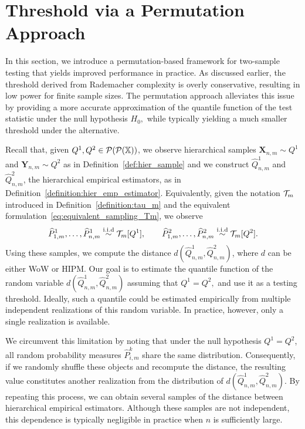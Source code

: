 \section{Threshold via a Permutation Approach}\label{section:permutation_approach}


In this section, we introduce a permutation-based framework for two-sample testing that yields improved performance in practice. As discussed earlier, the threshold derived from Rademacher complexity is overly conservative, resulting in low power for finite sample sizes. The permutation approach alleviates this issue by providing a more accurate approximation of the quantile function of the test statistic under the null hypothesis $H_0,$ while typically yielding a much smaller threshold under the alternative.

Recall that, given $Q^1,Q^2\in \mathcal{P}(\mathcal{P}(\mathbb{X}))$, we observe hierarchical samples $\mathbf{X}_{n,m} \sim Q^1$ and $\mathbf{Y}_{n,m} \sim Q^2$ as in Definition~\ref{def:hier_sample} and we construct $\widehat{Q}^1_{n,m}$ and $\widehat{Q}^{2}_{n,m}$, the hierarchical empirical estimators, as in Definition~\ref{definition:hier_emp_estimator}. Equivalently, given the notation $\mathcal{T}_m$ introduced in Definition~\ref{definition:tau_m} and the equivalent formulation~\eqref{eq:equivalent_sampling_Tm}, we observe
\[
\widehat{P}^1_{1,m}, \dots, \widehat{P}^1_{n,m} \overset{\mathrm{i.i.d}}{\sim} \mathcal{T}_m[Q^{1}], \qquad \widehat{P}^2_{1,m}, \dots, \widehat{P}^2_{n,m} \overset{\mathrm{i.i.d}}{\sim} \mathcal{T}_m[Q^{2}].
\]
Using these samples, we compute the distance $d(\widehat{Q}^1_{n,m}, \widehat{Q}^2_{n,m})$, where $d$ can be either WoW or HIPM. Our goal is to estimate the quantile function of the random variable $d(\widehat{Q}^1_{n,m}, \widehat{Q}^2_{n,m})$ assuming that $Q^1 = Q^2,$ and use it as a testing threshold. Ideally, such a quantile could be estimated empirically from multiple independent realizations of this random variable. In practice, however, only a single realization is available.

We circumvent this limitation by noting that under the null hypothesis $Q^1 = Q^2$, all random probability measures $\widehat{P}^k_{i,m}$ share the same distribution. Consequently, if we randomly shuffle these objects and recompute the distance, the resulting value constitutes another realization from the distribution of $d(\widehat{Q}^1_{n,m}, \widehat{Q}^2_{n,m})$. By repeating this process, we can obtain several samples of the distance between hierarchical empirical estimators. Although these samples are not independent, this dependence is typically negligible in practice when $n$ is sufficiently large.

